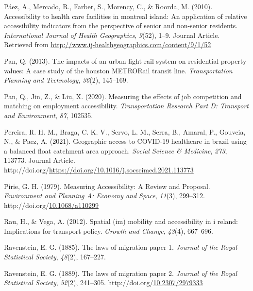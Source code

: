 \documentclass[
11pt, %
oneside, %
english, %
singlespacing, %
]{macthesis} %
\newlength{\cslhangindent}
\newenvironment{CSLReferences}[2] %
{\begin{list}{}{%
	\setlength{\itemindent}{0pt}
	\setlength{\leftmargin}{0pt}
	\setlength{\parsep}{0pt}
	\ifodd #1
	\setlength{\leftmargin}{\cslhangindent}
	\setlength{\itemindent}{-1\cslhangindent}
	\fi
	\setlength{\itemsep}{#2\baselineskip}}}
{\end{list}}
\begin{document}
\begin{CSLReferences}{1}{0}
Páez, A., Mercado, R., Farber, S., Morency, C., \& Roorda, M. (2010). Accessibility to health care facilities in montreal island: An application of relative accessibility indicators from the perspective of senior and non-senior residents. \emph{International Journal of Health Geographics}, \emph{9}(52), 1--9. Journal Article. Retrieved from \url{http://www.ij-healthgeographics.com/content/9/1/52}

Pan, Q. (2013). The impacts of an urban light rail system on residential property values: A case study of the houston METRORail transit line. \emph{Transportation Planning and Technology}, \emph{36}(2), 145--169.

Pan, Q., Jin, Z., \& Liu, X. (2020). Measuring the effects of job competition and matching on employment accessibility. \emph{Transportation Research Part D: Transport and Environment}, \emph{87}, 102535.

Pereira, R. H. M., Braga, C. K. V., Servo, L. M., Serra, B., Amaral, P., Gouveia, N., \& Paez, A. (2021). Geographic access to COVID-19 healthcare in brazil using a balanced float catchment area approach. \emph{Social Science \& Medicine}, \emph{273}, 113773. Journal Article. http://doi.org/\url{https://doi.org/10.1016/j.socscimed.2021.113773}

Pirie, G. H. (1979). Measuring {Accessibility}: {A} {Review} and {Proposal}. \emph{Environment and Planning A: Economy and Space}, \emph{11}(3), 299--312. http://doi.org/\href{https://doi.org/10.1068/a110299}{10.1068/a110299}

Rau, H., \& Vega, A. (2012). Spatial (im) mobility and accessibility in i reland: Implications for transport policy. \emph{Growth and Change}, \emph{43}(4), 667--696.

Ravenstein, E. G. (1885). The laws of migration paper 1. \emph{Journal of the Royal Statistical Society}, \emph{48}(2), 167--227.

Ravenstein, E. G. (1889). The laws of migration paper 2. \emph{Journal of the Royal Statistical Society}, \emph{52}(2), 241--305. http://doi.org/\href{https://doi.org/10.2307/2979333}{10.2307/2979333}


\end{CSLReferences}
\end{document}
